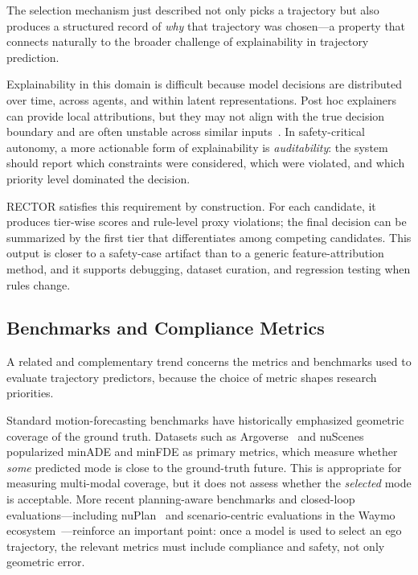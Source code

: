 The selection mechanism just described not only picks a trajectory but also produces a structured record of \emph{why} that trajectory was chosen---a property that connects naturally to the broader challenge of explainability in trajectory prediction.

Explainability in this domain is difficult because model decisions are distributed over time, across agents, and within latent representations.  Post hoc explainers can provide local attributions, but they may not align with the true decision boundary and are often unstable across similar inputs~\cite{ribeiro2016why,lakkaraju2016interpretable}.  In safety-critical autonomy, a more actionable form of explainability is \emph{auditability}: the system should report which constraints were considered, which were violated, and which priority level dominated the decision.

RECTOR satisfies this requirement by construction.  For each candidate, it produces tier-wise scores and rule-level proxy violations; the final decision can be summarized by the first tier that differentiates among competing candidates.  This output is closer to a safety-case artifact than to a generic feature-attribution method, and it supports debugging, dataset curation, and regression testing when rules change.

\subsection{Benchmarks and Compliance Metrics}
\label{subsec:benchmarks_metrics}

A related and complementary trend concerns the metrics and benchmarks used to evaluate trajectory predictors, because the choice of metric shapes research priorities.

Standard motion-forecasting benchmarks have historically emphasized geometric coverage of the ground truth.  Datasets such as Argoverse~\cite{chang2019argoverse} and nuScenes~\cite{caesar2020nuscenes} popularized minADE and minFDE as primary metrics, which measure whether \emph{some} predicted mode is close to the ground-truth future.  This is appropriate for measuring multi-modal coverage, but it does not assess whether the \emph{selected} mode is acceptable.  More recent planning-aware benchmarks and closed-loop evaluations---including nuPlan~\cite{caesar2021nuplan} and scenario-centric evaluations in the Waymo ecosystem~\cite{montali2024waymo}---reinforce an important point: once a model is used to select an ego trajectory, the relevant metrics must include compliance and safety, not only geometric error.

